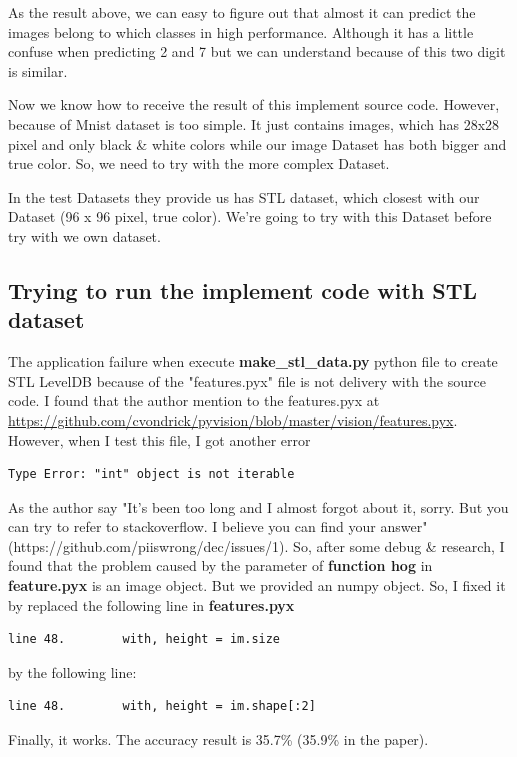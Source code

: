\documentclass[11pt]{article}
\begin{document}
As the result above, we can easy to figure out that almost it can predict the images belong to which classes in high performance. Although it has a little confuse when predicting 2 and 7 but we can understand because of this two digit is similar.

Now we know how to receive the result of this implement source code. However, because of Mnist dataset is too simple. It just contains images, which has 28x28 pixel and only black \& white colors while our image Dataset has both bigger and true color. So, we need to try with the more complex Dataset. 

In the test Datasets they provide us has STL dataset, which closest with our Dataset (96 x 96 pixel, true color). We're going to try with this Dataset before try with we own dataset.

\subsection{Trying to run the implement code with STL dataset}
The application failure when execute \textbf{make\_stl\_data.py} python file to create STL LevelDB because of the "features.pyx" file is not delivery with the source code. 
I found that the author mention to the features.pyx at \href{https://github.com/cvondrick/pyvision/blob/master/vision/features.pyx}{https://github.com/cvondrick/pyvision/blob/master/vision/features.pyx}. However, when I test this file, I got another error
\begin{verbatim}
Type Error: "int" object is not iterable
\end{verbatim}
As the author say "It's been too long and I almost forgot about it, sorry. But you can try to refer to stackoverflow. I believe you can find your answer" (https://github.com/piiswrong/dec/issues/1). So, after some debug \& research, I found that the problem caused by the parameter of \textbf{function hog} in \textbf{feature.pyx} is an image object. But we provided an numpy object. So, I fixed it by replaced the following line in \textbf{features.pyx}
\begin{verbatim}
line 48. 		with, height = im.size
\end{verbatim}
by the following line:
\begin{verbatim}
line 48. 		with, height = im.shape[:2]
\end{verbatim}
Finally, it works. The accuracy result is 35.7\% (35.9\% in the paper).
\end{document}
